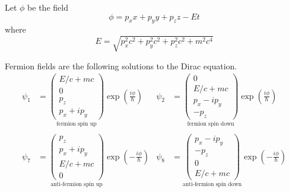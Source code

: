 \documentclass[12pt]{article}
\begin{document}
Let $\phi$ be the field
\begin{equation*}
\phi=p_xx+p_yy+p_zz-Et
\end{equation*}
where
\begin{equation*}
E=\sqrt{p_x^2c^2+p_y^2c^2+p_z^2c^2+m^2c^4}
\end{equation*}

Fermion fields are the following solutions to the Dirac equation.
\begin{align*}
\psi_1&=\underset{\text{fermion spin up}}{\begin{pmatrix}E/c+mc\\0\\p_z\\p_x+ip_y\end{pmatrix}}
\exp\left(\frac{i\phi}{\hbar}\right)
& \psi_2&=\underset{\text{fermion spin down}}{\begin{pmatrix}0\\E/c+mc\\p_x-ip_y\\-p_z\end{pmatrix}}
\exp\left(\frac{i\phi}{\hbar}\right)
\\
\\
\psi_7&=\underset{\text{anti-fermion spin up}}{\begin{pmatrix}p_z\\p_x+ip_y\\E/c+mc\\0\end{pmatrix}}
\exp\left(-\frac{i\phi}{\hbar}\right)
& \psi_8&=\underset{\text{anti-fermion spin down}}{\begin{pmatrix}p_x-ip_y\\-p_z\\0\\E/c+mc\end{pmatrix}}
\exp\left(-\frac{i\phi}{\hbar}\right)
\end{align*}
\end{document}
